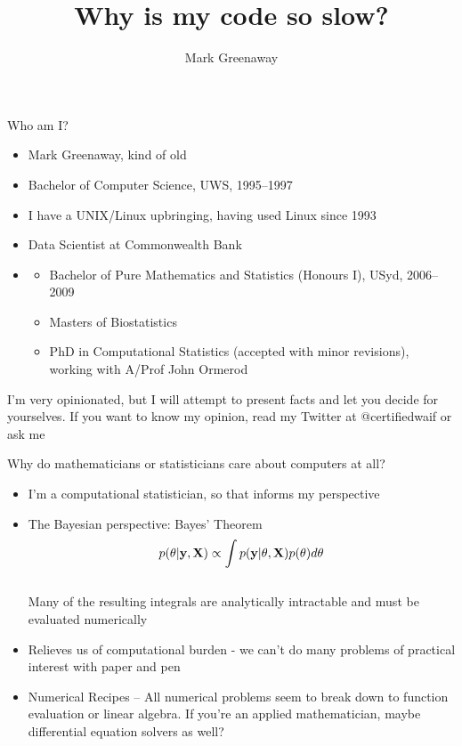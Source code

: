 \documentclass{beamer}
\title{Why is my code so slow?}
\author{Mark Greenaway}
\begin{document}
\begin{frame}
	\maketitle
\end{frame}

\begin{frame}{Who am I?}
	\begin{itemize}
		\item Mark Greenaway, kind of old
		\item Bachelor of Computer Science, UWS, 1995--1997
		\item I have a UNIX/Linux upbringing, having used Linux since 1993
		\item Data Scientist at Commonwealth Bank
		\item
			\begin{itemize}
				\item Bachelor of Pure Mathematics and Statistics (Honours I), USyd, 2006--2009
				\item Masters of Biostatistics
				\item PhD in Computational Statistics (accepted with minor revisions), working with A/Prof John Ormerod
			\end{itemize}
	\end{itemize}
	I'm very opinionated, but I will attempt to present facts and let you decide for yourselves. If you want to know my opinion, read my Twitter at @certifiedwaif or ask me
\end{frame}

\begin{frame}{Why do mathematicians or statisticians care about computers at all?}
	\begin{itemize}
		\item I'm a computational statistician, so that informs my perspective
		\item The Bayesian perspective: Bayes' Theorem
			$$p({\bf \theta}|{\bf y}, {\bf X}) \propto \int p({\bf y}|{\bf \theta}, {\bf X}) p({\bf \theta}) d {\bf \theta}$$ \\
			Many of the resulting integrals are analytically intractable and must be evaluated numerically
		\item Relieves us of computational burden - we can't do many problems of practical interest with paper and pen
		\item{Numerical Recipes} -- All numerical problems seem to break down to function evaluation or linear algebra. If you're an applied mathematician, maybe differential equation solvers as well? 
	\end{itemize}
\end{frame}
\end{document}
